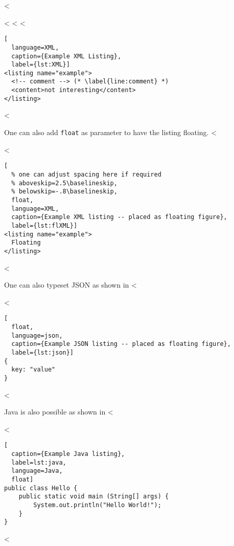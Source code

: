 <%

<%
<%
<%

\begin{lstlisting}[
  language=XML,
  caption={Example XML Listing},
  label={lst:XML}]
<listing name="example">
  <!-- comment --> (* \label{line:comment} *)
  <content>not interesting</content>
</listing>
\end{lstlisting}
<%

One can also add \verb+float+ as parameter to have the listing floating.
<%

<%
\begin{lstlisting}[
  % one can adjust spacing here if required
  % aboveskip=2.5\baselineskip,
  % belowskip=-.8\baselineskip,
  float,
  language=XML,
  caption={Example XML listing -- placed as floating figure},
  label={lst:flXML}]
<listing name="example">
  Floating
</listing>
\end{lstlisting}
<%

One can also typeset JSON as shown in <%

<%
\begin{lstlisting}[
  float,
  language=json,
  caption={Example JSON listing -- placed as floating figure},
  label={lst:json}]
{
  key: "value"
}
\end{lstlisting}
<%

Java is also possible as shown in <%

<%
\begin{lstlisting}[
  caption={Example Java listing},
  label=lst:java,
  language=Java,
  float]
public class Hello {
    public static void main (String[] args) {
        System.out.println("Hello World!");
    }
}
\end{lstlisting}
<%
